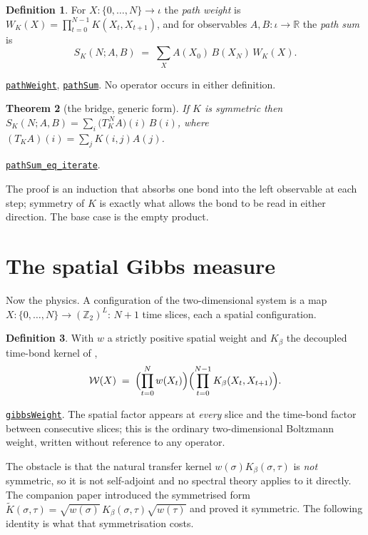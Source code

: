 \documentclass[11pt]{article}
\newtheorem{theorem}{Theorem}[section]
\theoremstyle{definition}
\newtheorem{definition}[theorem]{Definition}
\newcommand{\anchor}{c4fa6a9e6769496a7270981ef0908b2d644c230b}
\newcommand{\osline}[3]{%
  \href{https://github.com/lluiseriksson/THE-ERIKSSON-PROGRAMME/blob/\anchor/YangMills/OS/#1.lean\#L#2}{\nolinkurl{#3}}}
\newcommand{\R}{\mathbb{R}}
\newcommand{\Z}{\mathbb{Z}}
\begin{document}
\begin{definition}
For $X:\{0,\dots,N\}\to\iota$ the \emph{path weight} is
$W_K(X)=\prod_{t=0}^{N-1}K(X_t,X_{t+1})$, and for observables $A,B:\iota\to\R$
the \emph{path sum} is
\[
  S_K(N;A,B)\;=\;\sum_{X}A(X_0)\,B(X_N)\,W_K(X).
\]
\end{definition}

\osline{SpatialGibbs}{73}{pathWeight},
\osline{SpatialGibbs}{100}{pathSum}.
No operator occurs in either definition.

\begin{theorem}[the bridge, generic form]\label{thm:generic}
If $K$ is symmetric then
$S_K(N;A,B)=\sum_i \bigl(T_K^{\,N}A\bigr)(i)\,B(i)$, where
$(T_KA)(i)=\sum_j K(i,j)A(j)$.
\end{theorem}

\osline{SpatialGibbs}{130}{pathSum\_eq\_iterate}.

The proof is an induction that absorbs one bond into the left observable at
each step; symmetry of $K$ is exactly what allows the bond to be read in either
direction.  The base case is the empty product.

\section{The spatial Gibbs measure}\label{sec:measure}

Now the physics.  A configuration of the two-dimensional system is a map
$X:\{0,\dots,N\}\to(\Z_2)^L$: $N+1$ time slices, each a spatial configuration.

\begin{definition}\label{def:gibbs}
With $w$ a strictly positive spatial weight and $K_\beta$ the decoupled
time-bond kernel of \cite{ErikssonSpatial},
\[
  \mathcal{W}(X)\;=\;\Bigl(\prod_{t=0}^{N}w(X_t)\Bigr)
    \Bigl(\prod_{t=0}^{N-1}K_\beta(X_t,X_{t+1})\Bigr).
\]
\end{definition}

\osline{SpatialGibbs}{160}{gibbsWeight}.
The spatial factor appears at \emph{every} slice and the time-bond factor
between consecutive slices; this is the ordinary two-dimensional Boltzmann
weight, written without reference to any operator.

The obstacle is that the natural transfer kernel $w(\sigma)K_\beta(\sigma,\tau)$
is \emph{not} symmetric, so it is not self-adjoint and no spectral theory
applies to it directly.  The companion paper introduced the symmetrised form
$\widetilde K(\sigma,\tau)=\sqrt{w(\sigma)}\,K_\beta(\sigma,\tau)\sqrt{w(\tau)}$
and proved it symmetric.  The following identity is what that symmetrisation
costs.
\end{document}
